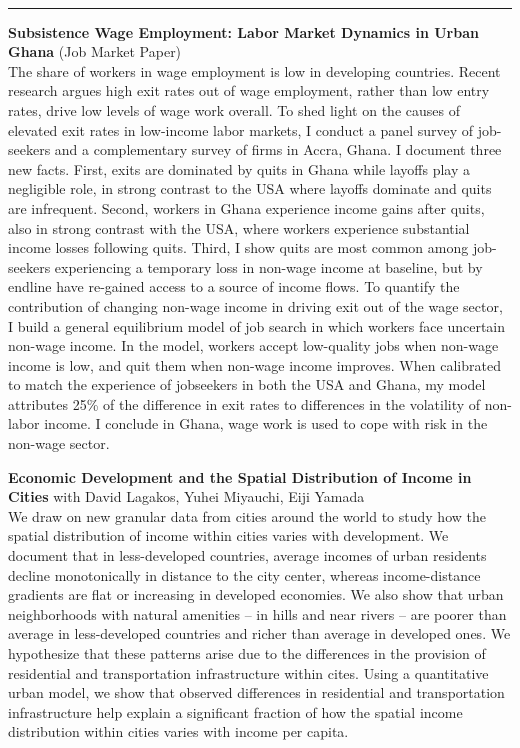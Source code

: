\documentclass[11pt]{article}
\begin{document}
\newpage
\thispagestyle{plain}
 \\
\rule{\textwidth}{1pt}

\noindent \textbf{Subsistence Wage Employment: Labor Market Dynamics in Urban Ghana} (Job Market Paper)
\vspace{5pt}\\
\noindent The share of workers in wage employment is low in developing countries. Recent research argues high exit rates out of wage employment, rather than low entry rates, drive low levels of wage work overall. To shed light on the causes of elevated exit rates in low-income labor markets, I conduct a panel survey of job-seekers and a complementary survey of firms in Accra, Ghana. I document three new facts. First, exits are dominated by quits in Ghana while layoffs play a negligible role, in strong contrast to the USA where layoffs dominate and quits are infrequent. Second, workers in Ghana experience income gains after quits, also in strong contrast with the USA, where workers experience substantial income losses following quits. Third, I show quits are most common among job-seekers experiencing a temporary loss in non-wage income at baseline, but by endline have re-gained access to a source of income flows. To quantify the contribution of changing non-wage income in driving exit out of the wage sector, I build a general equilibrium model of job search in which workers face uncertain non-wage income. In the model, workers accept low-quality jobs when non-wage income is low, and quit them when non-wage income improves. When calibrated to match the experience of jobseekers in both the USA and Ghana, my model attributes 25\% of the difference in exit rates to differences in the volatility of non-labor income. I conclude in Ghana, wage work is used to cope with risk in the non-wage sector. \\
\vspace*{5pt}


\noindent \textbf{Economic Development and the Spatial Distribution of Income in Cities} with David Lagakos, Yuhei Miyauchi, Eiji Yamada
\vspace{5pt}\\
\noindent We draw on new granular data from cities around the world to study how the spatial distribution of income within cities varies with development. We document that in less-developed countries, average incomes of urban residents decline monotonically in distance to the city center, whereas income-distance gradients are flat or increasing in developed economies. We also show that urban neighborhoods with natural amenities  -- in hills and near rivers -- are poorer than average in less-developed countries and richer than average in developed ones. We hypothesize that these patterns arise due to the differences in the provision of residential and transportation infrastructure within cites. Using a quantitative urban model, we show that observed differences in residential and transportation infrastructure help explain a significant fraction of how the spatial income distribution within cities varies with income per capita.

\end{document}
